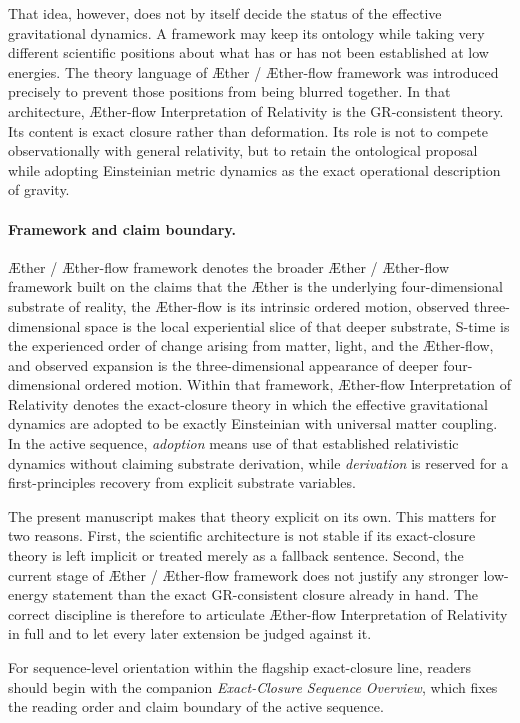 \documentclass[11pt]{article}
\newcommand{\Aether}{\AE{}ther}
\newcommand{\Aflow}{\AE{}ther-flow}
\newcommand{\TheoryName}{\Aflow{} Interpretation of Relativity}
\newcommand{\TheoryProgram}{\Aether{} / \Aflow{} framework}
\begin{document}
That idea, however, does not by itself decide the status of the effective gravitational dynamics. A framework may keep its ontology while taking very different scientific positions about what has or has not been established at low energies. The theory language of \TheoryProgram{} was introduced precisely to prevent those positions from being blurred together. In that architecture, \TheoryName{} is the GR-consistent theory. Its content is exact closure rather than deformation. Its role is not to compete observationally with general relativity, but to retain the ontological proposal while adopting Einsteinian metric dynamics as the exact operational description of gravity.

\paragraph{Framework and claim boundary.}
\TheoryProgram{} denotes the broader \Aether{} / \Aflow{} framework built on the claims that the \Aether{} is the underlying four-dimensional substrate of reality, the \Aflow{} is its intrinsic ordered motion, observed three-dimensional space is the local experiential slice of that deeper substrate, S-time is the experienced order of change arising from matter, light, and the \Aflow{}, and observed expansion is the three-dimensional appearance of deeper four-dimensional ordered motion. Within that framework, \TheoryName{} denotes the exact-closure theory in which the effective gravitational dynamics are adopted to be exactly Einsteinian with universal matter coupling. In the active sequence, \emph{adoption} means use of that established relativistic dynamics without claiming substrate derivation, while \emph{derivation} is reserved for a first-principles recovery from explicit substrate variables.

The present manuscript makes that theory explicit on its own. This matters for two reasons. First, the scientific architecture is not stable if its exact-closure theory is left implicit or treated merely as a fallback sentence. Second, the current stage of \TheoryProgram{} does not justify any stronger low-energy statement than the exact GR-consistent closure already in hand. The correct discipline is therefore to articulate \TheoryName{} in full and to let every later extension be judged against it.

For sequence-level orientation within the flagship exact-closure line, readers should begin with the companion \emph{Exact-Closure Sequence Overview}, which fixes the reading order and claim boundary of the active sequence.
\end{document}
